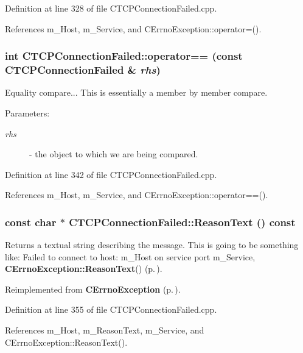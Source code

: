 Definition at line 328 of file CTCPConnection\-Failed.cpp.

References m\_\-Host, m\_\-Service, and CErrno\-Exception::operator=().
\subsubsection{\setlength{\rightskip}{0pt plus 5cm}int CTCPConnection\-Failed::operator== (const CTCPConnection\-Failed \& {\em rhs})}\label{classCTCPConnectionFailed_a4}


Equality compare... This is essentially a member by member compare. \begin{Desc}
\item[Parameters: ]\par
\begin{description}
\item[{\em 
rhs}]- the object to which we are being compared. \end{description}
\end{Desc}


Definition at line 342 of file CTCPConnection\-Failed.cpp.

References m\_\-Host, m\_\-Service, and CErrno\-Exception::operator==().
\subsubsection{\setlength{\rightskip}{0pt plus 5cm}const char $\ast$ CTCPConnection\-Failed::Reason\-Text () const\hspace{0.3cm}{\tt  [virtual]}}\label{classCTCPConnectionFailed_a7}


Returns a textual string describing the message. This is going to be something like: Failed to connect to host: m\_\-Host on service port m\_\-Service,  {\bf CErrno\-Exception::Reason\-Text}() {\rm (p.\,\pageref{classCErrnoException_a7})}. 

Reimplemented from {\bf CErrno\-Exception} {\rm (p.\,\pageref{classCErrnoException_a7})}.

Definition at line 355 of file CTCPConnection\-Failed.cpp.

References m\_\-Host, m\_\-Reason\-Text, m\_\-Service, and CErrno\-Exception::Reason\-Text().
